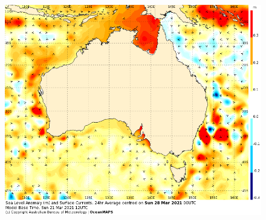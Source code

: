 \begin{frame}
\begin{minipage}{0.45\textwidth}
\begin{figure}
     \includegraphics[height=\textheight]{figures/images/IDYOC300.Aus.SLACur.168.png}
    \end{figure} 
\end{minipage}
\end{frame}
